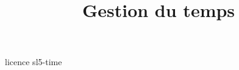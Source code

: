 \documentclass [xcolor=table] {beamer}
\title {Gestion du temps}
\begin{document}
 {licence}
 {sl5-time}
\end{document}
